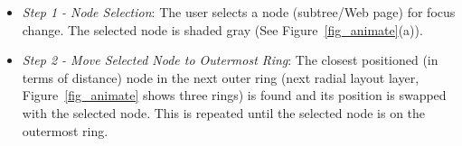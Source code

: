 \documentclass[]{article}
\begin{document}
{%








\begin{itemize}

\item {\em Step 1 - Node Selection}: The user selects a node (subtree/Web page) for focus change.  The selected node is shaded gray (See Figure~\ref{fig_animate}(a)).

\item {\em Step 2 - Move Selected Node to Outermost Ring}: The closest positioned (in terms of distance) node in the next outer ring (next radial layout layer, Figure~\ref{fig_animate} shows three rings) is found and its position is swapped with the selected node.  This is repeated until the selected node is on the outermost ring.


\end{itemize}}
\end{document}
